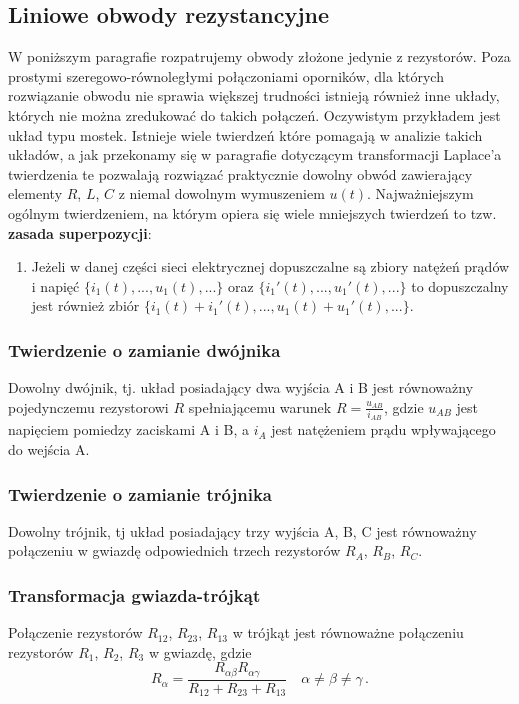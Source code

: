 \documentclass[../main.tex]{subfiles}
\begin{document}
\subsection{Liniowe obwody rezystancyjne}
W poniższym paragrafie rozpatrujemy obwody złożone jedynie z rezystorów. Poza prostymi szeregowo-równoległymi połączoniami oporników, dla których rozwiązanie obwodu nie sprawia większej trudności istnieją również inne układy, których nie można zredukować do takich połączeń. Oczywistym przykładem jest układ typu mostek. Istnieje wiele twierdzeń które pomagają w analizie takich układów, a jak przekonamy się w paragrafie dotyczącym transformacji Laplace'a twierdzenia te pozwalają rozwiązać praktycznie dowolny obwód zawierający elementy \(R\), \(L\), \(C\) z niemal dowolnym wymuszeniem \(u(t)\). Najważniejszym ogólnym twierdzeniem, na którym opiera się wiele mniejszych twierdzeń to tzw. \textbf{zasada superpozycji}:
\begin{enumerate}[]
    \item Jeżeli w danej części sieci elektrycznej dopuszczalne są zbiory natężeń prądów i napięć \(\{i_1(t),...,u_1(t),...\}\) oraz \(\{ i_1'(t),...,u_1'(t),... \}\) to dopuszczalny jest również zbiór \(\{i_1(t)+i_1'(t),...,u_1(t)+u_1'(t),...\}\).
\end{enumerate}
\subsubsection*{Twierdzenie o zamianie dwójnika}
Dowolny dwójnik, tj. układ posiadający dwa wyjścia A i B jest równoważny pojedynczemu rezystorowi \(R\) spełniającemu warunek \(R=\frac{u_{AB}}{i_{AB}}\), gdzie \(u_{AB}\) jest napięciem pomiedzy zaciskami A i B, a \(i_{A}\) jest natężeniem prądu wpływającego do wejścia A.

\subsubsection*{Twierdzenie o zamianie trójnika}
Dowolny trójnik, tj układ posiadający trzy wyjścia A, B, C jest równoważny połączeniu w gwiazdę odpowiednich trzech rezystorów \(R_A\), \(R_B\), \(R_C\).

\subsubsection*{Transformacja gwiazda-trójkąt}
Połączenie rezystorów \(R_{12}\), \(R_{23}\), \(R_{13}\) w trójkąt jest równoważne połączeniu rezystorów \(R_1\), \(R_2\), \(R_3\) w gwiazdę, gdzie
\begin{equation*}
    R_\alpha=\frac{R_{\alpha\beta}R_{\alpha\gamma}}{R_{12}+R_{23}+R_{13}}\quad \alpha\neq\beta\neq\gamma\,.
\end{equation*}
\end{document}
